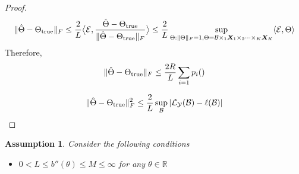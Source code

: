 \documentclass[11pt]{article}
\theoremstyle{plain}
\newtheorem{ass}{Assumption}
\theoremstyle{definition}
\begin{document}
\begin{proof}
\[
\lVert\hat \Theta-\Theta_{\text{true}}\rVert_F\leq {2\over L}\big\langle \mathcal{E}, {\hat \Theta -\Theta_{\text{true}} \over \lVert\hat \Theta-\Theta_{\text{true}}\rVert_F} \big\rangle\leq {2\over L}\sup_{\Theta: \lVert\Theta\rVert_F=1, \Theta=\mathcal{B}\times_1\bm X_1\times_2\cdots\times_K \bm X_K}\langle \mathcal{E}, \Theta \rangle
\]
Therefore, 
\[
\lVert\hat \Theta-\Theta_{\text{true}}\rVert_F\leq {2R\over L}  \sum_{i=1} p_i ()
\]

\[
\lVert\hat \Theta-\Theta_{\text{true}}\rVert_F^2\leq {2\over L}\sup_{\mathcal{B}}|\mathcal{L}_{\mathcal{Y}}(\mathcal{B})-\ell(\mathcal{B})|
\]
\end{proof}


\begin{ass}
Consider the following conditions
\begin{itemize}
\item $0<L\leq b''(\theta) \leq M\leq \infty$ for any $\theta \in \mathbb{R}$
\end{itemize}
\end{ass}
\end{document}

